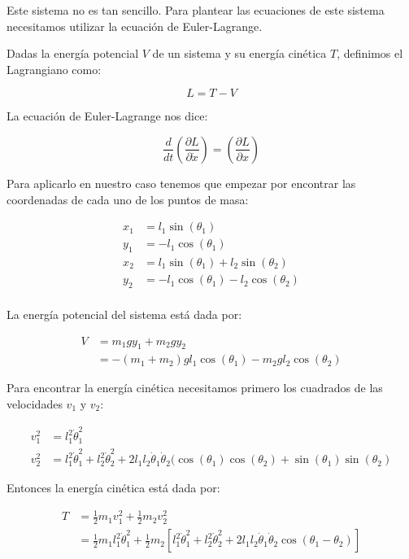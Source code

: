 \documentclass[
]{article}
\begin{document}
Este sistema no es tan sencillo. Para plantear las ecuaciones de este
sistema necesitamos utilizar la ecuación de Euler-Lagrange.

Dadas la energía potencial \(V\) de un sistema y su energía cinética
\(T\), definimos el Lagrangiano como:

\[
L = T - V
\]

La ecuación de Euler-Lagrange nos dice:

\[
    \frac{d}{dt} \left( \frac{\partial L}{\partial \dot{x}} \right) = \left( \frac{\partial L}{\partial x} \right)
\]

Para aplicarlo en nuestro caso tenemos que empezar por encontrar las
coordenadas de cada uno de los puntos de masa:

\[
\begin{aligned}
    x_1 &= l_1 \sin(\theta_1) \\
    y_1 &= - l_1 \cos(\theta_1) \\
    x_2 &= l_1 \sin(\theta_1) + l_2 \sin(\theta_2) \\
    y_2 &= - l_1 \cos(\theta_1) - l_2 \cos(\theta_2) \\
\end{aligned}
\]

La energía potencial del sistema está dada por:

\[
\begin{aligned}
    V &= m_1 g y_1 + m_2 g y_2 \\
    &= -(m_1+m_2) g l_1 \cos(\theta_1) - m_2 g l_2 \cos(\theta_2)
\end{aligned}
\]

Para encontrar la energía cinética necesitamos primero los cuadrados de
las velocidades \(v_1\) y \(v_2\):

\[
\begin{aligned}
    v_1^2 &= l_1^2 \dot{\theta}_1^2 \\
    v_2^2 &= l_1^2 \dot{\theta}_1^2 + l_2^2 \dot{\theta}_2^2 + 2 l_1 l_2 \dot{\theta}_1 \dot{\theta}_2 (\cos(\theta_1) \cos(\theta_2) + \sin(\theta_1) \sin(\theta_2)
\end{aligned}
\]

Entonces la energía cinética está dada por:

\[
\begin{aligned}
    T &= \frac{1}{2} m_1 v_1^2 + \frac{1}{2} m_2 v_2^2 \\
    &= \frac{1}{2} m_1 l_1^2 \dot{\theta}_1^2 + \frac{1}{2} m_2 [l_1^2 \dot{\theta}_1^2 + l_2^2 \dot{\theta}_2^2 + 2 l_1 l_2 \dot{\theta}_1 \dot{\theta}_2 \cos(\theta_1 - \theta_2)]
\end{aligned}
\]
\end{document}
